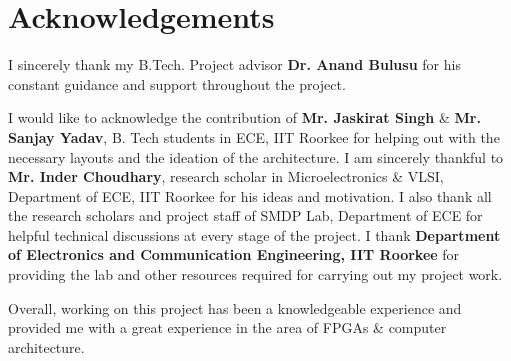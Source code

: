 %
%

\chapter*{Acknowledgements}
\begin{OnehalfSpacing}
\initial I sincerely thank my B.Tech. Project advisor \textbf{Dr. Anand Bulusu} for his constant guidance and support throughout the project. 

I would like to acknowledge the contribution of \textbf{Mr. Jaskirat Singh} \& \textbf{Mr. Sanjay Yadav}, B. Tech students in ECE, IIT Roorkee for helping out with the necessary layouts and the ideation of the architecture. I am sincerely thankful to \textbf{Mr. Inder Choudhary}, research scholar in Microelectronics \& VLSI, Department of ECE, IIT Roorkee for his ideas and motivation. I also thank all the research scholars and project staff of SMDP Lab, Department of ECE for helpful technical discussions at every stage of the project. I thank \textbf{Department of Electronics and Communication Engineering, IIT Roorkee} for providing the lab and other resources required for carrying out my project work. 

Overall, working on this project has been a knowledgeable experience and provided me with a great experience in the area of FPGAs \& computer architecture. 


\end{OnehalfSpacing}
\clearpage
